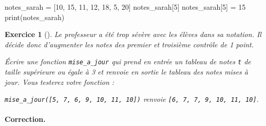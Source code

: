 \documentclass[12pt]{article}                   %
\newcounter{exoscount}
\theoremstyle{exercicestyle}
\newtheorem{exos}[exoscount]{Exercice}
\newenvironment{exo}[2]
  {
   \begin{exos}[#1]
   \leavevmode
   \marginpar{\hfill $#2 $ }}
  {\end{exos}}
\theoremstyle{break2}
\theoremstyle{break3}
\begin{document}
\begin{pyconsole}[][frame=single, framesep=2mm, label=Console Python,linenos=true]
notes_sarah = [10, 15, 11, 12, 18, 5, 20]
notes_sarah[5]
notes_sarah[5] = 15
print(notes_sarah)
\end{pyconsole}

\begin{exo}{}{  }
    Le professeur a été trop sévère avec les élèves dans sa notation. Il décide donc d'augmenter les notes des premier et troisième contrôle de 1 point. 

    Écrire une fonction \texttt{mise\_a\_jour} qui prend en entrée un tableau de notes \texttt{t} de taille supérieure ou égale à 3 et renvoie en sortie le tableau des notes mises à jour. Vous testerez votre fonction :

    \begin{center}
        \texttt{mise\_a\_jour([5, 7, 6, 9, 10, 11, 10])} renvoie \texttt{[6, 7, 7, 9, 10, 11, 10]}. 
    \end{center}
\end{exo} 

\paragraph{Correction.}
\inputminted[frame=single, framesep=2mm, label=Code Source,linenos=true]{python}{./pyfiles/mise_a_jour.py}
\end{document}
